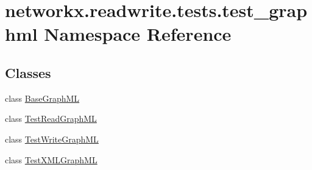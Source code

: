 \hypertarget{namespacenetworkx_1_1readwrite_1_1tests_1_1test__graphml}{}\section{networkx.\+readwrite.\+tests.\+test\+\_\+graphml Namespace Reference}
\label{namespacenetworkx_1_1readwrite_1_1tests_1_1test__graphml}
\subsection*{Classes}
\begin{DoxyCompactItemize}
\item 
class \hyperlink{classnetworkx_1_1readwrite_1_1tests_1_1test__graphml_1_1BaseGraphML}{Base\+Graph\+ML}
\item 
class \hyperlink{classnetworkx_1_1readwrite_1_1tests_1_1test__graphml_1_1TestReadGraphML}{Test\+Read\+Graph\+ML}
\item 
class \hyperlink{classnetworkx_1_1readwrite_1_1tests_1_1test__graphml_1_1TestWriteGraphML}{Test\+Write\+Graph\+ML}
\item 
class \hyperlink{classnetworkx_1_1readwrite_1_1tests_1_1test__graphml_1_1TestXMLGraphML}{Test\+X\+M\+L\+Graph\+ML}
\end{DoxyCompactItemize}
